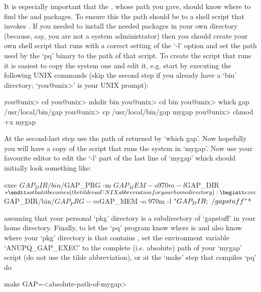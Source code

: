 It is especially important that the {\GAP}, whose path you  gave,  should
know where to find the {\ANUPQ} and {\AutPGrp} packages. To  ensure  this
the path should be to a shell script that invokes {\GAP}. If  you  needed
to install the needed packages in your own directory (because,  say,  you
are not a system administrator) then you should  create  your  own  shell
script that runs {\GAP} with a correct setting of the `-l' option and set
the path used by the `pq' binary to the path of that  script.  To  create
the script that runs {\GAP} it is easiest to copy the system one and edit
it, e.g. start by executing the following UNIX commands (skip the  second
step if you already have a `bin'  directory;  `you@unix>'  is  your  UNIX
prompt):

\begintt
you@unix> cd
you@unix> mkdir bin
you@unix> cd bin
you@unix> which gap
/usr/local/bin/gap
you@unix> cp /usr/local/bin/gap mygap
you@unix> chmod +x mygap
\endtt

At the second-last step use the path of {\GAP} returned by  `which  gap'.
Now hopefully you will have a copy of the script  that  runs  the  system
{\GAP} in `mygap'. Now use your favourite editor to edit the `-l' part of
the last line of `mygap' which should initially look something like:

\begintt
exec $GAP_DIR/bin/$GAP_PRG -m $GAP_MEM -o 970m -l $GAP_DIR $*
\endtt

so that it becomes (the tilde  is  a  UNIX  abbreviation  for  your  home
directory):

\begintt
exec $GAP_DIR/bin/$GAP_PRG -m $GAP_MEM -o 970m -l "$GAP_DIR;~/gapstuff" $*
\endtt

assuming that your personal {\GAP} `pkg' directory is a  subdirectory  of
`gapstuff' in your home directory. Finally, to let the `pq' program  know
where {\GAP} is and also know where your `pkg' directory is that contains
{\ANUPQ}, set the environment variable `ANUPQ_GAP_EXEC' to  the  complete
(i.e. absolute) path of  your  `mygap'  script  (do  not  use  the  tilde
abbreviation), or at the `make' step that compiles `pq' do

make GAP=<absolute-path-of-mygap>

